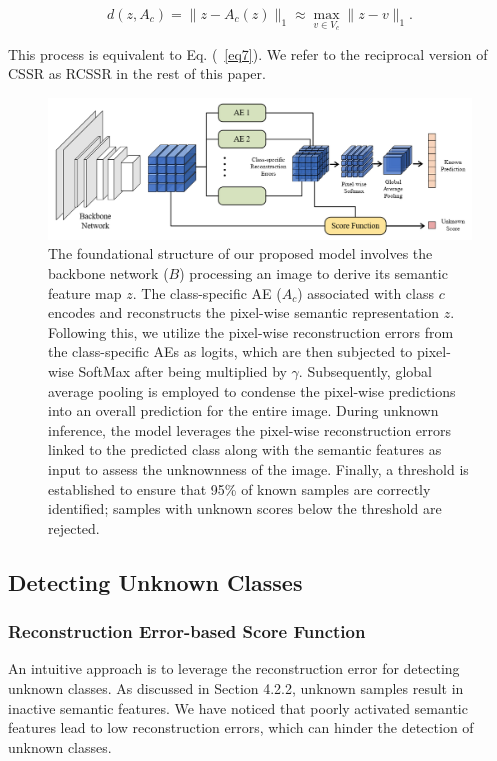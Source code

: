 \documentclass{gji}
\begin{document}
\[
d(z, A_c) = \|z - A_c(z)\|_{1} \approx \max_{v \in V_c} \|z - v\|_{1}. \tag{11} \label{eq11}
\]

This process is equivalent to Eq. (~\ref{eq7}). We refer to the reciprocal version of CSSR as RCSSR in the rest of this paper.

\begin{figure}
\label{fig5}
 \centering
  \includegraphics[width=1\textwidth]{fig5.png}
     \caption{The foundational structure of our proposed model involves the backbone network ($B$) processing an image to derive its semantic feature map $z$. The class-specific AE ($A_c$) associated with class $c$ encodes and reconstructs the pixel-wise semantic representation $z$. Following this, we utilize the pixel-wise reconstruction errors from the class-specific AEs as logits, which are then subjected to pixel-wise SoftMax after being multiplied by $\gamma$. Subsequently, global average pooling is employed to condense the pixel-wise predictions into an overall prediction for the entire image.
    During unknown inference, the model leverages the pixel-wise reconstruction errors linked to the predicted class along with the semantic features as input to assess the unknownness of the image. Finally, a threshold is established to ensure that 95\% of known samples are correctly identified; samples with unknown scores below the threshold are rejected.
    } \label{fig5}
   
\end{figure}

\subsection{Detecting Unknown Classes} \label{section4.4}
  \subsubsection{Reconstruction Error-based Score Function}
    An intuitive approach is to leverage the reconstruction error for detecting unknown classes. As discussed in Section 4.2.2, unknown samples result in inactive semantic features. We have noticed that poorly activated semantic features lead to low reconstruction errors, which can hinder the detection of unknown classes.
    
\end{document}
